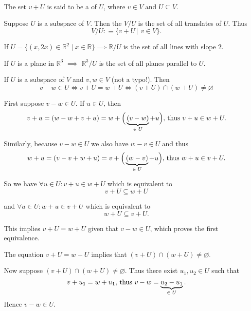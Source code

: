 \setcounter{thm}{96}
\begin{mydef} [translate]
  The set $v+U$ is said to be a  of $U$, where $v\in V$ and $U \subseteq V$.
\end{mydef}

\setcounter{thm}{98}
\begin{mydef} 
  Suppose $U$ is a subspace of $V$. Then the  $V/U$ is the set of all translates of $U$. Thus
  \begin{equation}
    V/U :\equiv \{v+U \mid v\in V\}.
  \end{equation}
\end{mydef}

\begin{example}
  If $U=\{ (x,2x)\in \mathbb{R}^2 \mid x\in \mathbb{R} \} \implies \mathbb{R}/U$ is the set of all lines with slope $2$.

  If $U$ is a plane in $\mathbb{R}^3$ $\implies$ $\mathbb{R}^3/U$ is the set of all planes parallel to $U$.
\end{example}

\begin{thm} 
  \label{thm: two translates of a subspace are equal or disjoint}
  If $ U $ is a subspace of $V$ and $v,w\in V$ (not a typo!). Then
  \begin{equation}
    v-w \in U \iff v+U = w + U \iff (v+U)\cap (w+U) \neq \varnothing
  \end{equation}
\end{thm}
\begin{prf}
  \StepOne First suppose $v-w\in U$. If $u \in U$, then
  \[
    v+u = (w - w + v + u) = w + \Big( \underbrace{(v-w)}_{\in \; U} + u\Big), $ thus $ v+u \in w+U.
  \]

  Similarly, because $v-w \in U$ we also have $w-v \in U$ and thus
  \[
    w+u = (v - v + w + u) = v+\Big( \underbrace{(w-v)}_{\in \; U}+u \Big), $ thus $ w+u \in v+U.
  \]

  So we have $\forall u \in U: v+u \in w+U$ which is equivalent to \[ v+U \subseteq w + U\]

  and $\forall u \in U: w+u \in v+U$ which is equivalent to \[ w+U \subseteq v+U.\]

  This implies $v+U = w+U$ given that $v-w \in U$, which proves the first equivalence.

  \StepTwo The equation $v+U = w+U$ implies that $(v+U) \cap (w+U) \neq \varnothing$.

  \StepThree Now suppose $(v+U) \cap (w+U) \neq \varnothing$. Thus there exist $u_1, u_2 \in U$ such that
  \[
    v+u_1 = w+u_1, $ thus $ v-w = \underbrace{u_2-u_1}_{\in \; U}.
  \]
  Hence $v-w \in U$.
\end{prf}

